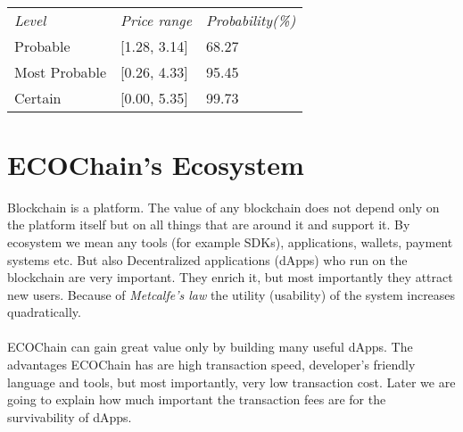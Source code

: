 \documentclass{article}
\begin{document}
\paragraph{}
\begin{table}[]
\begin{tabular}{lll}
\emph{Level}  & \emph{Price range}      & \emph{Probability(\%)} \\
Probable      & {[}1.28, 3.14{]} & 68.27           \\
Most Probable & {[}0.26, 4.33{]} & 95.45           \\
Certain       & {[}0.00, 5.35{]} & 99.73          
\end{tabular}
\end{table}


\section{ECOChain's Ecosystem}
Blockchain is a platform. The value of any blockchain does not depend only on the platform itself but on all things that are around it and support it. By ecosystem we mean any tools (for example SDKs), applications, wallets, payment systems etc. But also Decentralized  applications (dApps) who run on the blockchain are very important. They enrich it, but most importantly they attract new users. Because of \emph{Metcalfe's law} the utility (usability) of the system increases quadratically.
\paragraph{}
ECOChain can gain great value only by building many useful dApps. The advantages ECOChain has are high transaction speed, developer's friendly language and tools, but most importantly, very low transaction cost. Later we are going to explain how much important the transaction fees are for the survivability of dApps.
\end{document}
